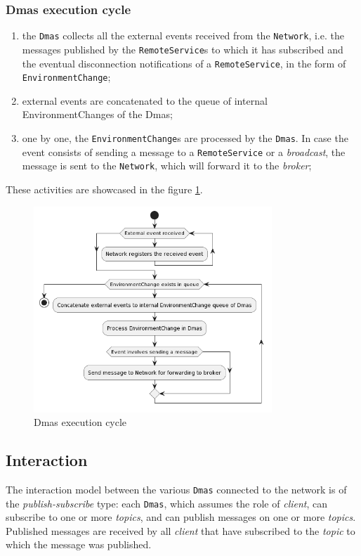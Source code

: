 \subsubsection{Dmas execution cycle}

\begin{enumerate}
    \item the \texttt{Dmas} collects all the external events received from the \texttt{Network}, i.e. the messages published by the \texttt{RemoteService}s to which it has subscribed and the eventual disconnection notifications of a \texttt{RemoteService}, in the form of \texttt{EnvironmentChange};
    \item external events are concatenated to the queue of internal EnvironmentChanges of the Dmas;
    \item one by one, the \texttt{EnvironmentChange}s are processed by the \texttt{Dmas}. In case the event consists of sending a message to a \texttt{RemoteService} or a \textit{broadcast}, the message is sent to the \texttt{Network}, which will forward it to the \textit{broker};
\end{enumerate}

These activities are showcased in the figure \ref{fig:execution}.

\begin{figure}
    \centering
    \includegraphics[width=0.8\textwidth]{figures/activity-applychanges.png}
    \caption{Dmas execution cycle}
    \label{fig:execution}
\end{figure}

\subsection{Interaction}
The interaction model between the various \texttt{Dmas} connected to the network is of the \textit{publish-subscribe} type: each \texttt{Dmas}, which assumes the role of \textit{client}, can subscribe to one or more \textit{topics}, and can publish messages on one or more \textit{topics}.
Published messages are received by all \textit{client} that have subscribed to the \textit{topic} to which the message was published.

